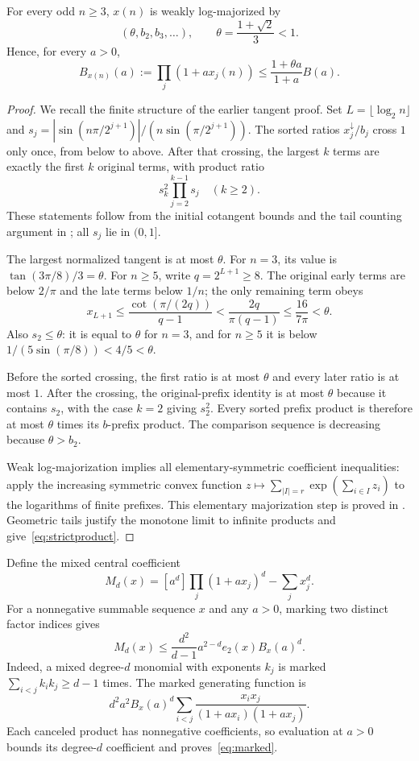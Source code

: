 \documentclass[11pt,a4paper]{article}
\theoremstyle{remark}\newtheorem*{ednote}{Editorial note (ProveIt, 2026-10-01)}
\begin{document}
\begin{lemma}\label{lem:strict}
For every odd $n\ge3$, $x(n)$ is weakly log-majorized by
\[
 (\theta,b_2,b_3,\ldots),\qquad\theta=\frac{1+\sqrt2}{3}<1.
\]
Hence, for every $a>0$,
\begin{equation}\label{eq:strictproduct}
 B_{x(n)}(a):=\prod_j(1+ax_j(n))
 \le\frac{1+\theta a}{1+a}B(a).
\end{equation}
\end{lemma}
\begin{proof}
We recall the finite structure of the earlier tangent proof. Set $L=\lfloor\log_2n\rfloor$ and $s_j=|\sin(n\pi/2^{j+1})|/(n\sin(\pi/2^{j+1}))$. The sorted ratios $x_j^\downarrow/b_j$ cross $1$ only once, from below to above. After that crossing, the largest $k$ terms are exactly the first $k$ original terms, with product ratio
\[
 s_k^2\prod_{j=2}^{k-1}s_j\quad(k\ge2).
\]
These statements follow from the initial cotangent bounds and the tail counting argument in \cite{triangle}; all $s_j$ lie in $(0,1]$.

The largest normalized tangent is at most $\theta$. For $n=3$, its value is $\tan(3\pi/8)/3=\theta$. For $n\ge5$, write $q=2^{L+1}\ge8$. The original early terms are below $2/\pi$ and the late terms below $1/n$; the only remaining term obeys
\[
 x_{L+1}\le\frac{\cot(\pi/(2q))}{q-1}
 <\frac{2q}{\pi(q-1)}\le\frac{16}{7\pi}<\theta.
\]
Also $s_2\le\theta$: it is equal to $\theta$ for $n=3$, and for $n\ge5$ it is below $1/(5\sin(\pi/8))<4/5<\theta$.

Before the sorted crossing, the first ratio is at most $\theta$ and every later ratio is at most $1$. After the crossing, the original-prefix identity is at most $\theta$ because it contains $s_2$, with the case $k=2$ giving $s_2^2$. Every sorted prefix product is therefore at most $\theta$ times its $b$-prefix product. The comparison sequence is decreasing because $\theta>b_2$.

Weak log-majorization implies all elementary-symmetric coefficient inequalities: apply the increasing symmetric convex function $z\mapsto\sum_{|I|=r}\exp(\sum_{i\in I}z_i)$ to the logarithms of finite prefixes. This elementary majorization step is proved in \cite{triangle}. Geometric tails justify the monotone limit to infinite products and give~\eqref{eq:strictproduct}.
\end{proof}

Define the mixed central coefficient
\[
 M_d(x)=[a^d]\prod_j(1+ax_j)^d-\sum_jx_j^d.
\]
For a nonnegative summable sequence $x$ and any $a>0$, marking two distinct factor indices gives
\begin{equation}\label{eq:marked}
 M_d(x)\le\frac{d^2}{d-1}a^{2-d}e_2(x)B_x(a)^d.
\end{equation}
Indeed, a mixed degree-$d$ monomial with exponents $k_j$ is marked $\sum_{i<j}k_ik_j\ge d-1$ times. The marked generating function is
\[
 d^2a^2 B_x(a)^d\sum_{i<j}\frac{x_ix_j}{(1+ax_i)(1+ax_j)}.
\]
Each canceled product has nonnegative coefficients, so evaluation at $a>0$ bounds its degree-$d$ coefficient and proves~\eqref{eq:marked}.
\end{document}
